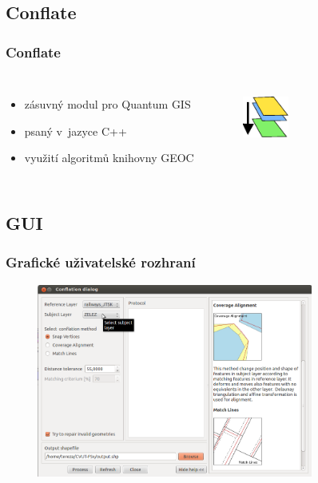 \documentclass[unicode,bookmarksnumbered]{beamer}
\begin{document}
  \subsection{Conflate} %
  \begin{frame}
  \frametitle{Conflate}
    \begin{columns}[c]
	\column{2.5in}
     \begin{itemize}
      \item zásuvný modul pro Quantum GIS
      \item psaný v~jazyce C++
      \item využití algoritmů knihovny GEOC
     \end{itemize}
     	\column{1.5in}
	  \begin{figure}
             \includegraphics[width=0.6in]{./pictures/icon.pdf}
	  \label{fig:icon}
	  \end{figure}
      \end{columns}
    \vspace{0.5cm}
     \begin{figure}
      \centering
      \scriptsize
      \def\svgwidth{4in}
      
      \label{fig:schema}
  \end{figure} 
  \end{frame}

  \subsection{GUI} %
  \begin{frame}
  \frametitle{Grafické uživatelské rozhraní}
     \begin{figure}
	  \centering
             \includegraphics[height=2.5in]{./pictures/dialog2.png}
	  \label{fig:dialog1}
	  \end{figure}
  \end{frame}
\end{document}
